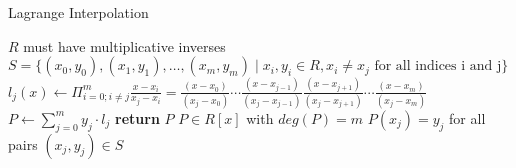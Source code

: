 \begin{algorithm}\caption{Lagrange Interpolation}
\label{alg_lagrange_interplation}
\begin{algorithmic}[0]
\Require $R$ must have multiplicative inverses
\Require $S= \{(x_0,y_0), (x_1,y_1),\ldots,(x_m,y_m)\;|\; x_i,y_i\in R, x_i\neq x_j\text{ for all indices i and j}\}$  
\State  $l_j(x) \gets \Pi_{i=0;i\neq j}^{m}\frac{x-x_i}{x_j-x_i} = \frac{(x-x_0)}{(x_j-x_0)} \cdots \frac{(x-x_{j-1})}{(x_j-x_{j - 1})} \frac{(x-x_{j+1})}{(x_j-x_{j+1})} \cdots \frac{(x-x_m)}{(x_j-x_m)}$
\EndFor
\State $P\gets \sum_{j=0}^m y_j\cdot l_j$
\State \textbf{return} $P$ 
\EndProcedure
\Ensure $P\in R[x]$ with $deg(P)=m$
\Ensure $P(x_j)=y_j$ for all pairs $(x_j,y_j)\in S$
\end{algorithmic}
\end{algorithm}

